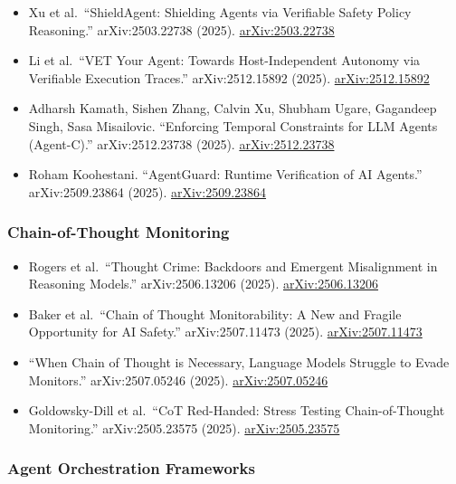 \documentclass[
]{article}
\providecommand{\tightlist}{%
  \setlength{\itemsep}{0pt}\setlength{\parskip}{0pt}}
\begin{document}
\begin{itemize}
\tightlist
\item
  Xu et al.~``ShieldAgent: Shielding Agents via Verifiable Safety Policy
  Reasoning.'' arXiv:2503.22738 (2025).
  \href{https://arxiv.org/abs/2503.22738}{arXiv:2503.22738}
\item
  Li et al.~``VET Your Agent: Towards Host-Independent Autonomy via
  Verifiable Execution Traces.'' arXiv:2512.15892 (2025).
  \href{https://arxiv.org/abs/2512.15892}{arXiv:2512.15892}
\item
  Adharsh Kamath, Sishen Zhang, Calvin Xu, Shubham Ugare, Gagandeep
  Singh, Sasa Misailovic. ``Enforcing Temporal Constraints for LLM
  Agents (Agent-C).'' arXiv:2512.23738 (2025).
  \href{https://arxiv.org/abs/2512.23738}{arXiv:2512.23738}
\item
  Roham Koohestani. ``AgentGuard: Runtime Verification of AI Agents.''
  arXiv:2509.23864 (2025).
  \href{https://arxiv.org/abs/2509.23864}{arXiv:2509.23864}
\end{itemize}

\subsubsection{Chain-of-Thought
Monitoring}\label{chain-of-thought-monitoring}

\begin{itemize}
\tightlist
\item
  Rogers et al.~``Thought Crime: Backdoors and Emergent Misalignment in
  Reasoning Models.'' arXiv:2506.13206 (2025).
  \href{https://arxiv.org/abs/2506.13206}{arXiv:2506.13206}
\item
  Baker et al.~``Chain of Thought Monitorability: A New and Fragile
  Opportunity for AI Safety.'' arXiv:2507.11473 (2025).
  \href{https://arxiv.org/abs/2507.11473}{arXiv:2507.11473}
\item
  ``When Chain of Thought is Necessary, Language Models Struggle to
  Evade Monitors.'' arXiv:2507.05246 (2025).
  \href{https://arxiv.org/abs/2507.05246}{arXiv:2507.05246}
\item
  Goldowsky-Dill et al.~``CoT Red-Handed: Stress Testing
  Chain-of-Thought Monitoring.'' arXiv:2505.23575 (2025).
  \href{https://arxiv.org/abs/2505.23575}{arXiv:2505.23575}
\end{itemize}

\subsubsection{Agent Orchestration
Frameworks}\label{agent-orchestration-frameworks}
\end{document}
